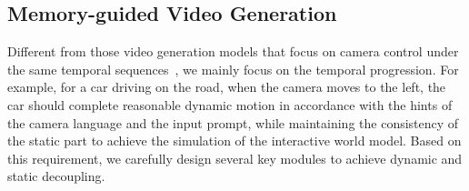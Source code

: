 \subsection{Memory-guided Video Generation}
\label{sec:mechanism}



Different from those video generation models that focus on camera control under the same temporal sequences~\cite{yu2025trajectorycrafter, bai2025syncammaster, bai2025recammaster, yu2024viewcrafter, gu2025das}, we mainly focus on the temporal progression. For example, for a car driving on the road, when the camera moves to the left, the car should complete reasonable dynamic motion in accordance with the hints of the camera language and the input prompt, while maintaining the consistency of the static part to achieve the simulation of the interactive world model. Based on this requirement, we carefully design several key modules to achieve dynamic and static decoupling.

